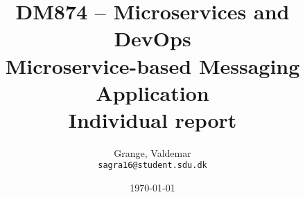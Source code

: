 \documentclass[12pt]{article}
\title{DM874 -- Microservices and DevOps \\ {\large Microservice-based Messaging Application} \\ Individual report}
\date{\longdate\today}
\author{
Grange, Valdemar \\ \texttt{sagra16@student.sdu.dk}
}
\begin{document}
    \begin{titlepage}
        \begin{center}
            \vspace*{-2cm}\hspace*{1cm}

            \vspace{2.5cm}


            {\let\newpage\relax\maketitle}
            \thispagestyle{empty}

            \vspace{0.8cm}

            \begin{minipage}{.8\textwidth}

            \end{minipage}

        \end{center}
    \end{titlepage}


    \newpage

    \setcounter{tocdepth}{2}





\end{document}
